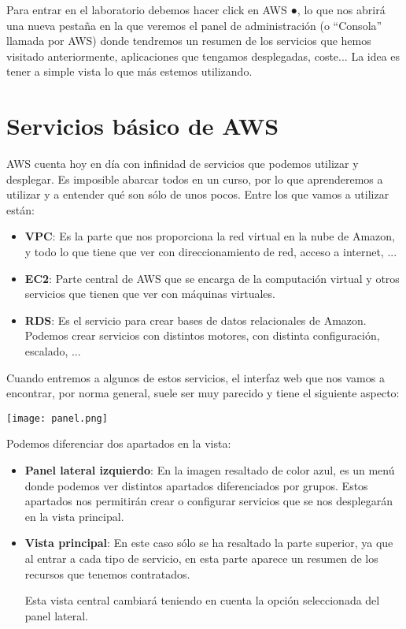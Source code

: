 Para entrar en el laboratorio debemos hacer click en {AWS \color{green}●}, lo que nos abrirá una nueva pestaña en la que veremos el panel de administración (o “Consola” llamada por AWS) donde tendremos un resumen de los servicios que hemos visitado anteriormente, aplicaciones que tengamos desplegadas, coste... La idea es tener a simple vista lo que más estemos utilizando.


\chapter{Servicios básico de AWS}

AWS cuenta hoy en día con infinidad de servicios que podemos utilizar y desplegar. Es imposible abarcar todos en un curso, por lo que aprenderemos a utilizar y a entender qué son sólo de unos pocos. Entre los que vamos a utilizar están:

\begin{itemize}
	\item \textbf{VPC}: Es la parte que nos proporciona la red virtual en la nube de Amazon, y todo lo que tiene que ver con direccionamiento de red, acceso a internet, ... 
	\item \textbf{EC2}: Parte central de AWS que se encarga de la computación virtual y otros servicios que tienen que ver con máquinas virtuales.
	\item \textbf{RDS}: Es el servicio para crear bases de datos relacionales de Amazon. Podemos crear servicios con distintos motores, con distinta configuración, escalado, ...
\end{itemize}

Cuando entremos a algunos de estos servicios, el interfaz web que nos vamos a encontrar, por norma general, suele ser muy parecido y tiene el siguiente aspecto:

\begin{center}
	\texttt{[image: panel.png]}
\end{center}

Podemos diferenciar dos apartados en la vista:
\begin{itemize}
	\item \textbf{Panel lateral izquierdo}: En la imagen resaltado de color azul, es un menú donde podemos ver distintos apartados diferenciados por grupos. Estos apartados nos permitirán crear o configurar servicios que se nos desplegarán en la vista principal.
	
	\item \textbf{Vista principal}: En este caso sólo se ha resaltado la parte superior, ya que al entrar a cada tipo de servicio, en esta parte aparece un resumen de los recursos que tenemos contratados.
	
	Esta vista central cambiará teniendo en cuenta la opción seleccionada del panel lateral.
\end{itemize}

